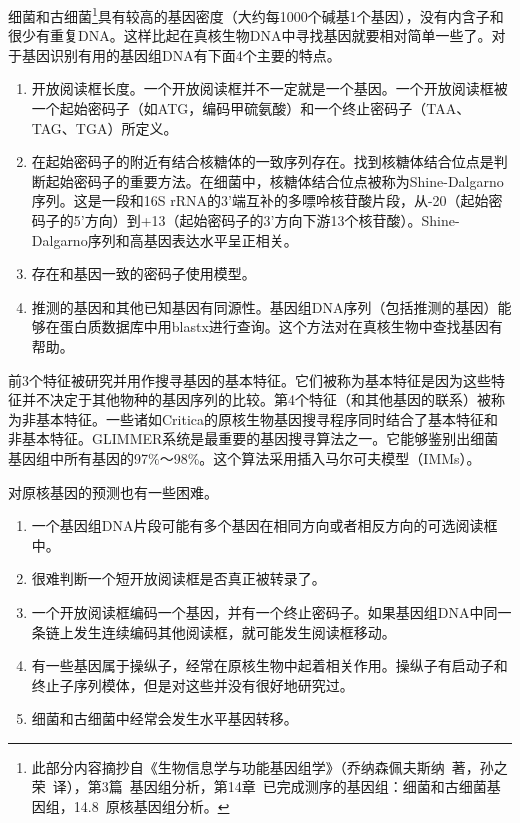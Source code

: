 \documentclass[11pt,a4paper,twoside]{book}
\begin{document}
细菌和古细菌\footnote{此部分内容摘抄自《生物信息学与功能基因组学》（乔纳森\textbullet 佩夫斯纳\ 著，孙之荣\ 译），第3篇\ 基因组分析，第14章\ 已完成测序的基因组：细菌和古细菌基因组，14.8\ 原核基因组分析。}具有较高的基因密度（大约每1000个碱基1个基因），没有内含子和很少有重复DNA。这样比起在真核生物DNA中寻找基因就要相对简单一些了。对于基因识别有用的基因组DNA有下面4个主要的特点。
\begin{enumerate}
  \item
    开放阅读框长度。一个开放阅读框并不一定就是一个基因。一个开放阅读框被一个起始密码子（如ATG，编码甲硫氨酸）和一个终止密码子（TAA、TAG、TGA）所定义。
  \item 在起始密码子的附近有结合核糖体的一致序列存在。找到核糖体结合位点是判断起始密码子的重要方法。在细菌中，核糖体结合位点被称为Shine-Dalgarno序列。这是一段和16S rRNA的3'端互补的多嘌呤核苷酸片段，从-20（起始密码子的5'方向）到+13（起始密码子的3'方向下游13个核苷酸）。Shine-Dalgarno序列和高基因表达水平呈正相关。
  \item 存在和基因一致的密码子使用模型。
  \item 推测的基因和其他已知基因有同源性。基因组DNA序列（包括推测的基因）能够在蛋白质数据库中用blastx进行查询。这个方法对在真核生物中查找基因有帮助。
\end{enumerate}
前3个特征被研究并用作搜寻基因的基本特征。它们被称为基本特征是因为这些特征并不决定于其他物种的基因序列的比较。第4个特征（和其他基因的联系）被称为非基本特征。一些诸如Critica的原核生物基因搜寻程序同时结合了基本特征和非基本特征。GLIMMER系统是最重要的基因搜寻算法之一。它能够鉴别出细菌基因组中所有基因的97\%～98\%。这个算法采用插入马尔可夫模型（IMMs）。

对原核基因的预测也有一些困难。
\begin{enumerate}
  \item 一个基因组DNA片段可能有多个基因在相同方向或者相反方向的可选阅读框中。
  \item 很难判断一个短开放阅读框是否真正被转录了。
  \item
    一个开放阅读框编码一个基因，并有一个终止密码子。如果基因组DNA中同一条链上发生连续编码其他阅读框，就可能发生阅读框移动。
  \item 有一些基因属于操纵子，经常在原核生物中起着相关作用。操纵子有启动子和终止子序列模体，但是对这些并没有很好地研究过。
  \item 细菌和古细菌中经常会发生水平基因转移。
\end{enumerate}
\end{document}

